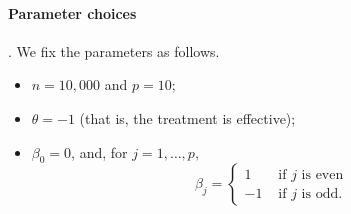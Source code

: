 \documentclass[11pt]{article}
\begin{document}
\paragraph{Parameter choices}. We fix the parameters as follows.
\begin{itemize}
    \item $n=10,000$ and $p=10$;
    \item $\theta = -1$ (that is, the treatment is effective);
    \item $\beta_0 = 0$, and, for $j=1,\dots,p,$
    \[
        \beta_j = \begin{cases}
        1 &\text{ if $j$ is even}\\
        -1  &\text{ if $j$ is odd}.
        \end{cases}
    \]
\end{itemize}
\end{document}
